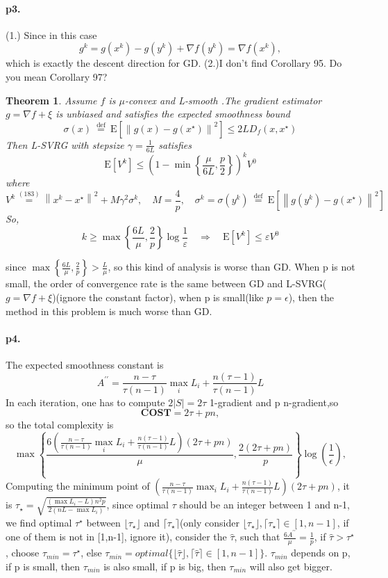 \documentclass[12pt,a4paper]{article}
\newtheorem*{theorem}{Theorem}
\begin{document}
\paragraph{p3.}
(1.) Since in this case 
$$
g^{k}=g\left(x^{k}\right)-g\left(y^{k}\right)+\nabla f\left(y^{k}\right)=\nabla f(x^k),
$$
which is exactly the descent direction for GD.
(2.)I don't find Corollary 95. Do you mean Corollary 97?
\begin{theorem}
	Assume $f$ is $\mu$-convex and L-smooth .The gradient estimator $g=\nabla f+\xi$ is unbiased and satisfies the expected smoothness bound
	$$
	\sigma(x) \stackrel{\text { def }}{=} \mathrm{E}\left[\left\|g(x)-g\left(x^{\star}\right)\right\|^{2}\right] \leq 2 L D_{f}\left(x, x^{\star}\right)
	$$
	Then L-SVRG with stepsize $\gamma=\frac{1}{6 L}$ satisfies
	$$
	\mathrm{E}\left[V^{k}\right] \leq\left(1-\min \left\{\frac{\mu}{6 L}, \frac{p}{2}\right\}\right)^{k} V^{0}
	$$
	where
	$$
	V^{k} \stackrel{(183)}{=}\left\|x^{k}-x^{\star}\right\|^{2}+M \gamma^{2} \sigma^{k}, \quad M=\frac{4}{p}, \quad \sigma^{k}=\sigma\left(y^{k}\right) \stackrel{\text { def }}{=} \mathrm{E}\left[\left\|g\left(y^{k}\right)-g\left(x^{\star}\right)\right\|^{2}\right]
	$$
	So,
	$$
	k \geq \max \left\{\frac{6 L}{\mu}, \frac{2}{p}\right\} \log \frac{1}{\varepsilon} \quad \Rightarrow \quad \mathrm{E}\left[V^{k}\right] \leq \varepsilon V^{0}
	$$
\end{theorem}
since $\max \left\{\frac{6 L}{\mu}, \frac{2}{p}\right\}>\frac{L}{\mu}$, so this kind of analysis is worse than GD. When p is not small, the order of convergence rate is the same between GD and L-SVRG($g=\nabla f+\xi$)(ignore the constant factor),  when p is small(like $p=\epsilon$), then the method in this problem is
much worse than GD. 
\paragraph{p4.}
The expected smoothness constant is $$
A^{\prime \prime}=\frac{n-\tau}{\tau(n-1)} \max _{i} L_{i}+\frac{n(\tau-1)}{\tau(n-1)} L
$$
In each iteration, one has to compute $2|S|=2\tau$ 1-gradient and p n-gradient,so
\begin{equation*}
	\textbf{COST}=2\tau +pn,
\end{equation*} 
so the total complexity is 
$$
\max\left\{\frac{6(\frac{n-\tau}{\tau(n-1)} \max _{i} L_{i}+\frac{n(\tau-1)}{\tau(n-1)} L)(2\tau+pn)}{\mu},\frac{2(2\tau+pn)}{p}\right\}\log(\frac{1}{\epsilon}),
$$
Computing the minimum point of $(\frac{n-\tau}{\tau(n-1)} \max _{i} L_{i}+\frac{n(\tau-1)}{\tau(n-1)} L)(2\tau+pn)$, it is $\tau_{\star}=\sqrt{\frac{(\max L_i-L)n^2p}{2(nL-\max L_i)}}$, since optimal $\tau$ should be an integer between 1 and n-1, we find optimal $\tau^{\star}$ between $\lfloor \tau_{\star}\rfloor$ and $\lceil \tau_{\star}\rceil$(only consider $\lfloor \tau_{\star}\rfloor,\lceil \tau_{\star}\rceil\in [1,n-1]$, if one of them is not in [1,n-1], ignore it), consider the $\hat{\tau}$, such that $\frac{6 A^{\prime\prime}}{\mu}=\frac{1}{p}$, if $\hat{\tau}>\tau^{\star}$, choose $\tau_{min}=\tau^{\star}$, else $\tau_{min}=optimal\{\lfloor\hat{\tau}\rfloor,\lceil\hat{\tau}\rceil\in \left[1,n-1\right]\}$. $\tau_{min}$ depends on p, if p is small, then $\tau_{min}$ is also small, if p is big, then $\tau_{min}$ will also get bigger.
\end{document}
